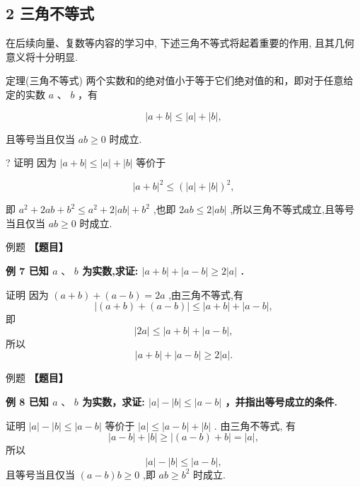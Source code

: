 \documentclass[a4paper,10pt,oneside,fontset=none]{ctexbook}
\renewcommand{\geq}{\geqslant}
\renewcommand{\leq}{\leqslant}
\newcounter{example}[chapter]
\newenvironment{example}[1][]{\begin{exBox}{例题}{#1}}{\end{exBox}}
\numberwithin{equation}{chapter}
\begin{document}
\subsection{2 三角不等式}

在后续向量、复数等内容的学习中, 下述三角不等式将起着重要的作用, 且其几何意义将十分明显.

定理(三角不等式) 两个实数和的绝对值小于等于它们绝对值的和，即对于任意给定的实数 $a\text{ 、 }b$ ，有

$$
\left| {a + b}\right|  \leq  \left| a\right|  + \left| b\right| ,
$$

且等号当且仅当 ${ab} \geq  0$ 时成立.

? 证明 因为 $\left| {a + b}\right|  \leq  \left| a\right|  + \left| b\right|$ 等价于

$$
{\left| a + b\right| }^{2} \leq  {\left( \left| a\right|  + \left| b\right| \right) }^{2},
$$

即 ${a}^{2} + {2ab} + {b}^{2} \leq  {a}^{2} + 2\left| {ab}\right|  + {b}^{2}$ ,也即 ${2ab} \leq  2\left| {ab}\right|$ ,所以三角不等式成立,且等号当且仅当 ${ab} \geq  0$ 时成立.

\begin{example}
\textbf{【题目】}\par\vspace{0.3em}
\textbf{例 7 已知 $a\text{ 、 }b$ 为实数,求证: $\left| {a + b}\right|  + \left| {a - b}\right|  \geq  2\left| a\right|$ .}\par\vspace{0.3em}
证明 因为 $\left( {a + b}\right)  + \left( {a - b}\right)  = {2a}$ ,由三角不等式,有
$$
\left| {\left( {a + b}\right)  + \left( {a - b}\right) }\right|  \leq  \left| {a + b}\right|  + \left| {a - b}\right| ,
$$
即
$$
\left| {2a}\right|  \leq  \left| {a + b}\right|  + \left| {a - b}\right| ,
$$
所以
$$
\left| {a + b}\right|  + \left| {a - b}\right|  \geq  2\left| a\right| .
$$
\end{example}

\begin{example}
\textbf{【题目】}\par\vspace{0.3em}
\textbf{例 8 已知 $a\text{ 、 }b$ 为实数，求证: $\left| a\right|  - \left| b\right|  \leq  \left| {a - b}\right|$ ，并指出等号成立的条件.}\par\vspace{0.3em}
证明 $\left| a\right|  - \left| b\right|  \leq  \left| {a - b}\right|$ 等价于 $\left| a\right|  \leq  \left| {a - b}\right|  + \left| b\right|$ . 由三角不等式, 有
$$
\left| {a - b}\right|  + \left| b\right|  \geq  \left| {\left( {a - b}\right)  + b}\right|  = \left| a\right| ,
$$
所以
$$
\left| a\right|  - \left| b\right|  \leq  \left| {a - b}\right| ,
$$
且等号当且仅当 $\left( {a - b}\right) b \geq  0$ ,即 ${ab} \geq  {b}^{2}$ 时成立.
\end{example}
\end{document}
